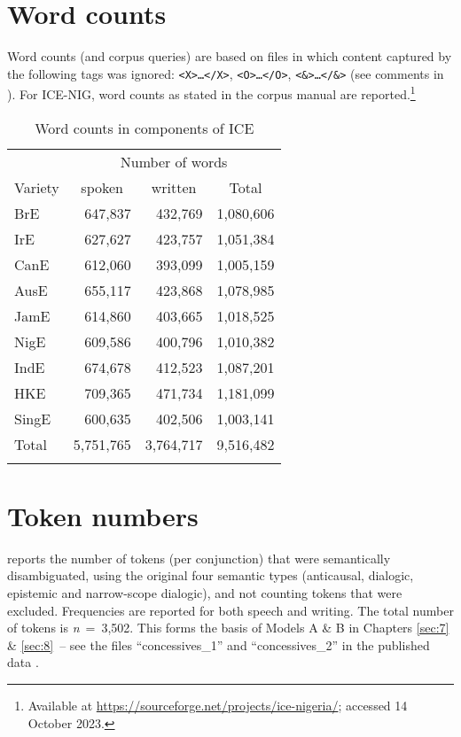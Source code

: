 \section{\label{bkm:Ref497474782}Word counts}\label{appendix:A.2}

Word counts (and corpus queries) are based on files in which content captured by the following tags was ignored: \texttt{<X>…</X>}, \texttt{<O>…</O>}, \texttt{<\&>…</\&>} (see comments in ). For ICE-NIG, word counts as stated in the corpus manual are reported.\footnote{Available at \url{https://sourceforge.net/projects/ice-nigeria/}; accessed 14 October 2023.}

\begin{table}[H]
\caption{Word counts in components of ICE\label{tab:A2}}

\begin{tabular}{lrrr}
\lsptoprule
 & \multicolumn{3}{c}{Number of words}\\\cmidrule(lr){2-4}
Variety & \multicolumn{1}{c}{spoken} & \multicolumn{1}{c}{written} & \multicolumn{1}{c}{Total}\\\midrule
BrE & 647,837 & 432,769 & 1,080,606\\
IrE & 627,627 & 423,757 & 1,051,384\\
CanE & 612,060 & 393,099 & 1,005,159\\
AusE & 655,117 & 423,868 & 1,078,985\\
JamE & 614,860 & 403,665 & 1,018,525\\
NigE & 609,586 & 400,796 & 1,010,382\\
IndE & 674,678 & 412,523 & 1,087,201\\
HKE & 709,365 & 471,734 & 1,181,099\\
SingE & 600,635 & 402,506 & 1,003,141\\\midrule
Total & 5,751,765 & 3,764,717 & 9,516,482\\
\lspbottomrule
\end{tabular}
\end{table}

\section{Token numbers}\label{appendix:A.3}\label{bkm:Ref41473918}\label{bkm:Ref51055053}\largerpage

 reports the number of tokens (per conjunction) that were semantically disambiguated, using the original four semantic types (anticausal, dialogic, epistemic and narrow-scope dialogic), and not counting tokens that were excluded. Frequencies are reported for both speech and writing. The total number of tokens is \textit{n}~=~3,502. This forms the basis of Models A \& B in Chapters \ref{sec:7} \& \ref{sec:8}~– see the files “concessives\_1” and “concessives\_2” in the published data \citep{Schützler2021}.

